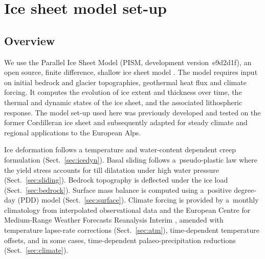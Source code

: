 \documentclass[tc, manuscript]{copernicus}
\begin{document}
\section{Ice sheet model set-up}
\label{sec:model}

\subsection{Overview}
\label{sec:overview}

    We use the Parallel Ice Sheet Model (PISM, development version~e9d2d1f), an
    open source, finite difference, shallow ice sheet model
    \citep{PISM-authors.2017}. The model requires input on initial bedrock and
    glacier topographies, geothermal heat flux and climate forcing. It computes
    the
    evolution of ice extent and thickness over time, the thermal and dynamic
    states of the ice sheet, and the associated lithospheric response. The
    model set-up used here was previously developed and tested on the former
    Cordilleran ice sheet \citep{Seguinot.2014, Seguinot.etal.2014,
    Seguinot.etal.2016} and subsequently adapted for steady climate
    \citep{Becker.etal.2016} and regional \citep{Jouvet.etal.2017a,
    Becker.etal.2017} applications to the European Alps.

    Ice deformation follows a temperature and water-content dependent creep
    formulation
    (Sect.~\ref{sec:icedyn}). Basal sliding follows a~pseudo-plastic law where
    the yield stress accounts for till dilatation under high water
    pressure (Sect.~\ref{sec:sliding}). Bedrock topography is deflected
    under the ice load (Sect.~\ref{sec:bedrock}). Surface mass balance is
    computed using a~positive degree-day (PDD) model (Sect.~\ref{sec:surface}).
    Climate forcing is provided by a~monthly climatology from interpolated
    observational data \citep[WorldClim;][]{Hijmans.etal.2005} and the European
    Centre for Medium-Range Weather Forecasts Reanalysis Interim
    \citep[ERA-Interim;][]{Dee.etal.2011}, amended with temperature lapse-rate
    corrections (Sect.~\ref{sec:atm}), time-dependent temperature offsets, and
    in some cases, time-dependent palaeo-precipitation reductions
    (Sect.~\ref{sec:climate}).
\end{document}
